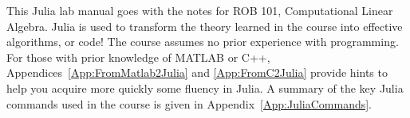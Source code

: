 This Julia lab manual goes with the notes for ROB 101, Computational Linear Algebra. Julia is used to transform the theory learned in the course into effective algorithms, or code! The course assumes no prior experience with programming. For those with prior knowledge of MATLAB or C++, Appendices~\ref{App:FromMatlab2Julia} and \ref{App:FromC2Julia} provide hints to help you acquire more quickly some fluency in Julia. A summary of the key Julia commands used in the course is given in Appendix~\ref{App:JuliaCommands}.